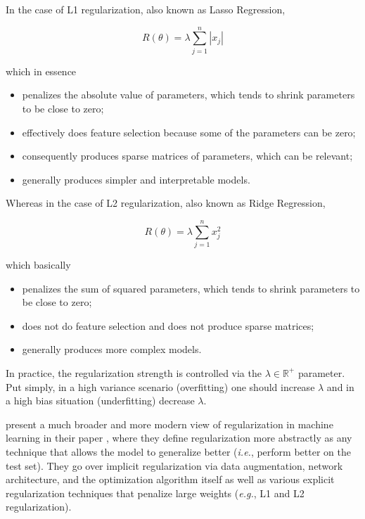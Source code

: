 In the case of L1 regularization, also known as Lasso Regression,

\begin{equation}
R(\theta) = \lambda \sum_{j=1}^{n} |x_j|
\end{equation}

which in essence

\begin{itemize}
    \item penalizes the absolute value of parameters, which tends to shrink parameters to be close to zero;
    \item effectively does feature selection because some of the parameters can be zero;
    \item consequently produces sparse matrices of parameters, which can be relevant;
    \item generally produces simpler and interpretable models.
\end{itemize}

Whereas in the case of L2 regularization, also known as Ridge Regression,

\begin{equation}
R(\theta) = \lambda \sum_{j=1}^{n} x_j^2
\end{equation}

which basically

\begin{itemize}
    \item penalizes the sum of squared parameters, which tends to shrink parameters to be close to zero;
    \item does not do feature selection and does not produce sparse matrices;
    \item generally produces more complex models.
\end{itemize}

In practice, the regularization strength is controlled via the $\lambda \in \mathbb{{R}^{+}}$ parameter. Put simply, in a high variance scenario (overfitting) one should increase $\lambda$ and in a high bias situation (underfitting) decrease $\lambda$.

\citeauthor{regularizationsurvey} present a much broader and more modern view of regularization in machine learning in their \citeyear{regularizationsurvey} paper \cite{regularizationsurvey}, where they define regularization more abstractly as any technique that allows the model to generalize better (\textit{i.e.}, perform better on the test set). They go over implicit regularization via data augmentation, network architecture, and the optimization algorithm itself as well as various explicit regularization techniques that penalize large weights (\textit{e.g.}, L1 and L2 regularization).

